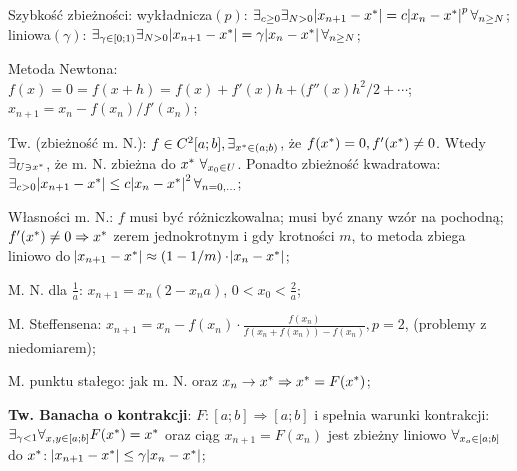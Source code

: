 


\entry
Szybkość zbieżności:
wykładnicza$(p)$:
$\exists_{c \geq 0} \exists_{N > 0}
\abs{x_{n + 1} - x^{*}} = c \abs{x_n - x^{*}}^p \forall_{n \geq N}$;
liniowa$(\gamma)$:
$\exists_{\gamma \in [0;1)} \exists_{N > 0}
\abs{x_{n + 1} - x^{*}} = \gamma \abs{x_n - x^{*}} \forall_{n \geq N}$;

\entry
Metoda Newtona:
$f(x) = 0 = f(x+h) = f(x) + f'(x)h + (f''(x)h^2/2+\cdots$;
$x_{n+1} = x_n - f(x_n)/f'(x_n)$;

\entry
Tw. (zbieżność m. N.):
$f \in C^2[a;b], \exists_{x^{*} \in (a;b)}$,
że $f(x^{*})=0, f'(x^{*}) \neq 0$.
Wtedy $\exists_{U \ni x^{*}}$, że m. N. zbieżna do $x^{*} \ \forall_{x_0 \in U}$.
Ponadto zbieżność kwadratowa:
$\exists_{c>0} \abs{x_{n+1} - x^{*}} \leq c \abs{x_n - x^{*}}^2 \forall_{n=0,\ldots}$;

\entry
Własności m. N.:
\subentry
$f$ musi być różniczkowalna;
\subentry
musi być znany wzór na pochodną;
\subentry
$f'(x^{*}) \neq 0 \Rightarrow x^{*}$ zerem jednokrotnym i gdy krotności $m$, 
to metoda zbiega liniowo do 
$\abs{x_{n+1} - x^{*}} \approx (1-1/m) \cdot \abs{x_n - x^{*}}$;

\entry
M. N. dla
$\frac{1}{a}$: $x_{n+1} = x_n(2 - x_na)$, $0<x_0<\frac{2}{a}$;



\entry
M. Steffensena:
$x_{n+1} = x_n - f(x_n) \cdot \frac{f(x_n)}{f(x_n + f(x_n)) - f(x_n)}, p=2$,
(problemy z niedomiarem);



\entry
M. punktu stałego:
jak m. N. oraz
$x_n \rightarrow x^{*} \Rightarrow x^{*} = F(x^{*})$;

\entry
\textbf{Tw. Banacha o kontrakcji}:
$F:[a;b] \Rightarrow [a;b]$
i spełnia warunki kontrakcji:
$\exists_{\gamma < 1} \forall_{x,y \in [a;b]} F(x^{*}) = x^{*}$
oraz ciąg 
$x_{n+1} = F(x_n)$ 
jest zbieżny liniowo 
$\forall_{x_o \in [a;b]}$
do $x^{*}$:
$\abs{x_{n+1} - x^{*}} \leq \gamma \abs{x_n - x^{*}}$;
